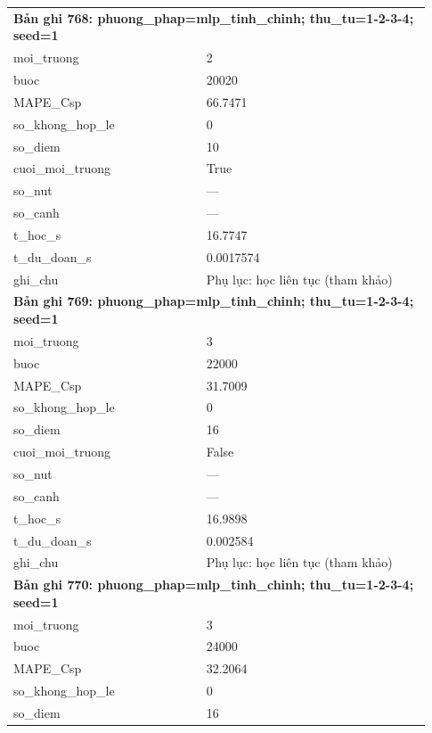 \begin{longtable}{p{0.43\linewidth}p{0.50\linewidth}}
\midrule
\multicolumn{2}{p{0.95\linewidth}}{\textbf{Bản ghi 768: phuong\_phap=mlp\_tinh\_chinh; thu\_tu=1-2-3-4; seed=1}} \\
moi\_\allowbreak truong & 2 \\
buoc & 20020 \\
MAPE\_\allowbreak Csp & 66.7471 \\
so\_\allowbreak khong\_\allowbreak hop\_\allowbreak le & 0 \\
so\_\allowbreak diem & 10 \\
cuoi\_\allowbreak moi\_\allowbreak truong & True \\
so\_\allowbreak nut & — \\
so\_\allowbreak canh & — \\
t\_\allowbreak hoc\_\allowbreak s & 16.7747 \\
t\_\allowbreak du\_\allowbreak doan\_\allowbreak s & 0.0017574 \\
ghi\_\allowbreak chu & Phụ lục: học liên tục (tham khảo) \\
\midrule
\multicolumn{2}{p{0.95\linewidth}}{\textbf{Bản ghi 769: phuong\_phap=mlp\_tinh\_chinh; thu\_tu=1-2-3-4; seed=1}} \\
moi\_\allowbreak truong & 3 \\
buoc & 22000 \\
MAPE\_\allowbreak Csp & 31.7009 \\
so\_\allowbreak khong\_\allowbreak hop\_\allowbreak le & 0 \\
so\_\allowbreak diem & 16 \\
cuoi\_\allowbreak moi\_\allowbreak truong & False \\
so\_\allowbreak nut & — \\
so\_\allowbreak canh & — \\
t\_\allowbreak hoc\_\allowbreak s & 16.9898 \\
t\_\allowbreak du\_\allowbreak doan\_\allowbreak s & 0.002584 \\
ghi\_\allowbreak chu & Phụ lục: học liên tục (tham khảo) \\
\midrule
\multicolumn{2}{p{0.95\linewidth}}{\textbf{Bản ghi 770: phuong\_phap=mlp\_tinh\_chinh; thu\_tu=1-2-3-4; seed=1}} \\
moi\_\allowbreak truong & 3 \\
buoc & 24000 \\
MAPE\_\allowbreak Csp & 32.2064 \\
so\_\allowbreak khong\_\allowbreak hop\_\allowbreak le & 0 \\
so\_\allowbreak diem & 16 \\

\end{longtable}
